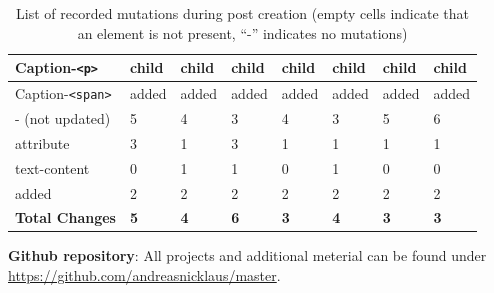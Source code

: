 \documentclass[a4paper, 10pt]{article}
\begin{document}
\begin{table}[ht]
\begin{adjustbox}{angle=90}
\begin{tabular}{|l|l|l|l|l|l|l|l|}
      Caption-\verb|<p>|              & child               & child         & child               & child         & child           & child           & child           \\ \hline
      Caption-\verb|<span>|           & added               & added         & added               & added         & added           & added           & added           \\ \hline
      \hline
      - (not updated)                 & 5                   & 4             & 3                   & 4             & 3               & 5               & 6               \\ \hline
      \hline
      attribute                       & 3                   & 1             & 3                   & 1             & 1               & 1               & 1               \\ \hline
      text-content                    & 0                   & 1             & 1                   & 0             & 1               & 0               & 0               \\ \hline
      added                           & 2                   & 2             & 2                   & 2             & 2               & 2               & 2               \\ \hline
      \hline
      \textbf{Total Changes}          & \textbf{5}        & \textbf{4}      & \textbf{6}          & \textbf{3}    & \textbf{4}      & \textbf{3}      & \textbf{3}      \\ \hline
    \end{tabular}
  \end{adjustbox}
  \caption{List of recorded mutations during post creation (empty cells indicate that an element is not present, \enquote{-} indicates no mutations)}
  \label{tab:mutations:postCreation}
\end{table}

\pagebreak

\glsaddall
\printnoidxglossary[
  type=\acronymtype,
  style=long
]

\nocite{*}
{}

\vfill
\textbf{Github repository}: All projects and additional meterial can be found under \url{https://github.com/andreasnicklaus/master}.
\end{document}
